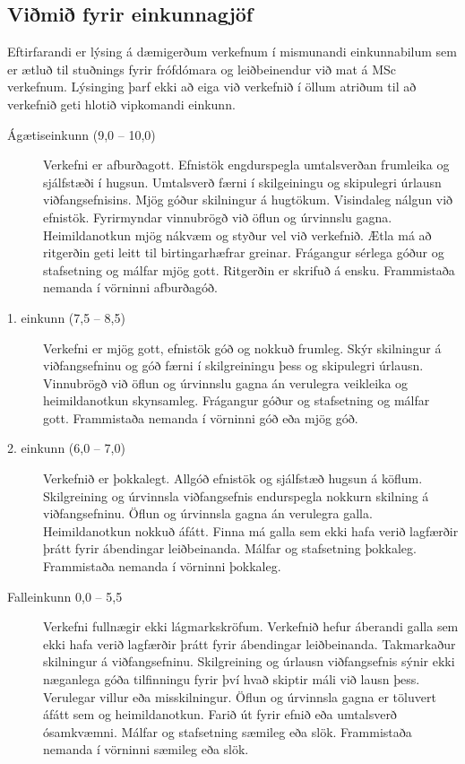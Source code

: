 \subsection{Viðmið fyrir einkunnagjöf}
Eftirfarandi er lýsing á dæmigerðum verkefnum í mismunandi einkunnabilum sem er ætluð til stuðnings fyrir frófdómara og leiðbeinendur við mat á MSc verkefnum.
Lýsinging þarf ekki að eiga við verkefnið í öllum atriðum til að verkefnið geti hlotið vipkomandi einkunn.

\begin{description}
\item[Ágætiseinkunn (9,0 -- 10,0)] Verkefni er afburðagott.
  Efnistök engdurspegla umtalsverðan frumleika og sjálfstæði í hugsun.
  Umtalsverð færni í skilgeiningu og skipulegri úrlausn viðfangsefnisins.
  Mjög góður skilningur á hugtökum.
  Visindaleg nálgun við efnistök.
  Fyrirmyndar vinnubrögð við öflun og úrvinnslu gagna.
  Heimildanotkun mjög nákvæm og styður vel við verkefnið.
  Ætla má að ritgerðin geti leitt til birtingarhæfrar greinar.
  Frágangur sérlega góður og stafsetning og málfar mjög gott.
  Ritgerðin er skrifuð á ensku.
  Frammistaða nemanda í vörninni afburðagóð.
\item[1. einkunn (7,5 -- 8,5)] Verkefni er mjög gott, efnistök góð og nokkuð frumleg.
  Skýr skilningur á viðfangsefninu og góð færni í skilgreiningu þess og skipulegri úrlausn.
  Vinnubrögð við öflun og úrvinnslu gagna án verulegra veikleika og heimildanotkun skynsamleg.
  Frágangur góður og stafsetning og málfar gott.
  Frammistaða nemanda í vörninni góð eða mjög góð.
\item[2. einkunn (6,0 -- 7,0)]  Verkefnið er þokkalegt.
  Allgóð efnistök og sjálfstæð hugsun á köflum.
  Skilgreining og úrvinnsla viðfangsefnis endurspegla nokkurn skilning á viðfangsefninu.
  Öflun og úrvinnsla gagna án verulegra galla.
  Heimildanotkun nokkuð áfátt.
  Finna má galla sem ekki hafa verið lagfærðir þrátt fyrir ábendingar leiðbeinanda.
  Málfar og stafsetning þokkaleg.
  Frammistaða nemanda í vörninni þokkaleg.
\item[Falleinkunn 0,0 -- 5,5]  Verkefni fullnægir ekki lágmarkskröfum.
  Verkefnið hefur áberandi galla sem ekki hafa verið lagfærðir þrátt fyrir ábendingar leiðbeinanda.
  Takmarkaður skilningur á viðfangsefninu.
  Skilgreining og úrlausn viðfangsefnis sýnir ekki næganlega góða tilfinningu fyrir því hvað skiptir máli við lausn þess.
  Verulegar villur eða misskilningur.
  Öflun og úrvinnsla gagna er töluvert áfátt sem og heimildanotkun.
  Farið út fyrir efnið eða umtalsverð ósamkvæmni.
  Málfar og stafsetning sæmileg eða slök.
  Frammistaða nemanda í vörninni sæmileg eða slök.
\end{description}

